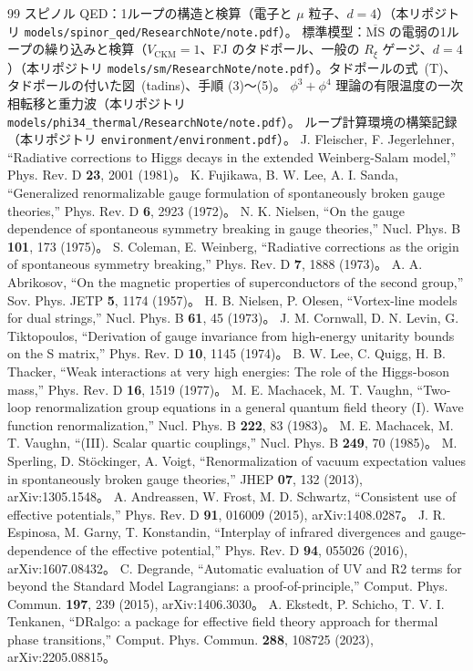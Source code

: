\documentclass[a4paper,10pt]{ltjsarticle}
\newcommand{\MSbar}{\overline{\mathrm{MS}}}
\begin{document}
\begin{thebibliography}{99}
 スピノル QED：1ループの構造と検算（電子と $\mu$ 粒子、$d=4$）（本リポジトリ \nolinkurl{models/spinor_qed/ResearchNote/note.pdf}）。
 標準模型：$\MSbar$ の電弱の1ループの繰り込みと検算（$V_{\mathrm{CKM}}=1$、FJ のタドポール、一般の $R_\xi$ ゲージ、$d=4$）（本リポジトリ \nolinkurl{models/sm/ResearchNote/note.pdf}）。タドポールの式~(T)、タドポールの付いた図~(tadins)、手順 (3)〜(5)。
 $\phi^3+\phi^4$ 理論の有限温度の一次相転移と重力波（本リポジトリ \nolinkurl{models/phi34_thermal/ResearchNote/note.pdf}）。
 ループ計算環境の構築記録（本リポジトリ \nolinkurl{environment/environment.pdf}）。
 J. Fleischer, F. Jegerlehner, ``Radiative corrections to Higgs decays in the extended Weinberg-Salam model,'' Phys. Rev. D \textbf{23}, 2001 (1981)。
 K. Fujikawa, B. W. Lee, A. I. Sanda, ``Generalized renormalizable gauge formulation of spontaneously broken gauge theories,'' Phys. Rev. D \textbf{6}, 2923 (1972)。
 N. K. Nielsen, ``On the gauge dependence of spontaneous symmetry breaking in gauge theories,'' Nucl. Phys. B \textbf{101}, 173 (1975)。
 S. Coleman, E. Weinberg, ``Radiative corrections as the origin of spontaneous symmetry breaking,'' Phys. Rev. D \textbf{7}, 1888 (1973)。
 A. A. Abrikosov, ``On the magnetic properties of superconductors of the second group,'' Sov. Phys. JETP \textbf{5}, 1174 (1957)。
 H. B. Nielsen, P. Olesen, ``Vortex-line models for dual strings,'' Nucl. Phys. B \textbf{61}, 45 (1973)。
 J. M. Cornwall, D. N. Levin, G. Tiktopoulos, ``Derivation of gauge invariance from high-energy unitarity bounds on the S matrix,'' Phys. Rev. D \textbf{10}, 1145 (1974)。
 B. W. Lee, C. Quigg, H. B. Thacker, ``Weak interactions at very high energies: The role of the Higgs-boson mass,'' Phys. Rev. D \textbf{16}, 1519 (1977)。
 M. E. Machacek, M. T. Vaughn, ``Two-loop renormalization group equations in a general quantum field theory (I). Wave function renormalization,'' Nucl. Phys. B \textbf{222}, 83 (1983)。
 M. E. Machacek, M. T. Vaughn, ``(III). Scalar quartic couplings,'' Nucl. Phys. B \textbf{249}, 70 (1985)。
 M. Sperling, D. Stöckinger, A. Voigt, ``Renormalization of vacuum expectation values in spontaneously broken gauge theories,'' JHEP \textbf{07}, 132 (2013), arXiv:1305.1548。
 A. Andreassen, W. Frost, M. D. Schwartz, ``Consistent use of effective potentials,'' Phys. Rev. D \textbf{91}, 016009 (2015), arXiv:1408.0287。
 J. R. Espinosa, M. Garny, T. Konstandin, ``Interplay of infrared divergences and gauge-dependence of the effective potential,'' Phys. Rev. D \textbf{94}, 055026 (2016), arXiv:1607.08432。
 C. Degrande, ``Automatic evaluation of UV and R2 terms for beyond the Standard Model Lagrangians: a proof-of-principle,'' Comput. Phys. Commun. \textbf{197}, 239 (2015), arXiv:1406.3030。
 A. Ekstedt, P. Schicho, T. V. I. Tenkanen, ``DRalgo: a package for effective field theory approach for thermal phase transitions,'' Comput. Phys. Commun. \textbf{288}, 108725 (2023), arXiv:2205.08815。
\end{thebibliography}
\end{document}
